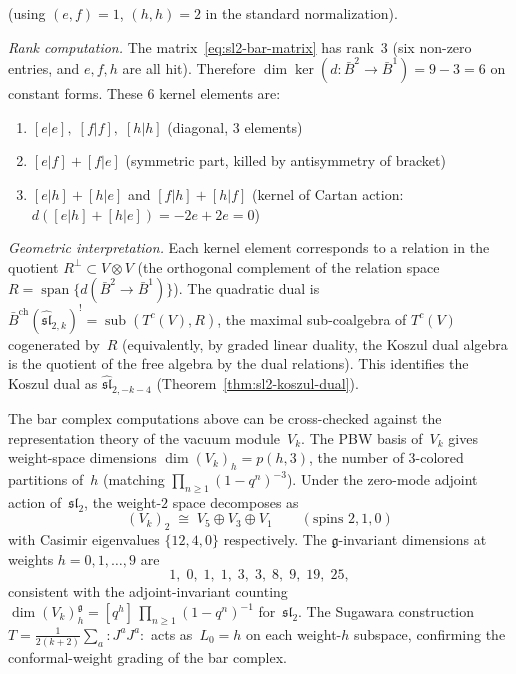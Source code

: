 \begin{computation}
(using $(e,f) = 1$, $(h,h) = 2$ in the standard normalization).

\emph{Rank computation.}
The matrix~\eqref{eq:sl2-bar-matrix} has rank~$3$
(six non-zero entries, and $e, f, h$ are all hit).
Therefore $\dim \ker(d\colon \bar{B}^2 \to \bar{B}^1) = 9 - 3 = 6$
on constant forms.  These 6 kernel elements are:
\begin{enumerate}
\item $[e|e],\; [f|f],\; [h|h]$ (diagonal, $3$ elements)
\item $[e|f] + [f|e]$ (symmetric part, killed by antisymmetry of bracket)
\item $[e|h] + [h|e]$ and $[f|h] + [h|f]$
  (kernel of Cartan action: $d([e|h] + [h|e]) = -2e + 2e = 0$)
\end{enumerate}

\emph{Geometric interpretation.}
Each kernel element corresponds to a relation in the quotient
$R^\perp \subset V \otimes V$ (the orthogonal complement of the
relation space $R = \operatorname{span}\{d(\bar{B}^2 \to \bar{B}^1)\}$).  The quadratic dual is
$\bar{B}^{\mathrm{ch}}(\widehat{\mathfrak{sl}}_{2,k})^!
= \operatorname{sub}(T^c(V), R)$, the maximal sub-coalgebra of $T^c(V)$ cogenerated by~$R$ (equivalently, by graded linear duality, the Koszul dual algebra is the quotient of the free algebra by the dual relations). This identifies the Koszul dual as
$\widehat{\mathfrak{sl}}_{2,-k-4}$
(Theorem~\ref{thm:sl2-koszul-dual}).
\end{computation}

\begin{remark}\label{rem:sl2-vacuum-module-verification}
The bar complex computations above can be cross-checked against
the representation theory of the vacuum module~$V_k$.
The PBW basis of~$V_k$ gives weight-space dimensions
$\dim(V_k)_h = p(h,3)$, the number of $3$-colored partitions of~$h$
(matching $\prod_{n \ge 1}(1-q^n)^{-3}$).
Under the zero-mode adjoint action of~$\mathfrak{sl}_2$,
the weight-$2$ space decomposes as
\begin{equation}\label{eq:sl2-weight2-decomp}
(V_k)_2 \;\cong\; V_5 \oplus V_3 \oplus V_1
\qquad (\text{spins } 2, 1, 0)
\end{equation}
with Casimir eigenvalues $\{12, 4, 0\}$ respectively.
The $\mathfrak{g}$-invariant dimensions at weights $h = 0, 1,
\ldots, 9$ are
\[
1,\; 0,\; 1,\; 1,\; 3,\; 3,\; 8,\; 9,\; 19,\; 25,
\]
consistent with the adjoint-invariant counting
$\dim (V_k)_h^{\mathfrak{g}} = [q^h]\,\prod_{n \ge 1}
(1-q^n)^{-1}$ for~$\mathfrak{sl}_2$.
The Sugawara construction
$T = \frac{1}{2(k+2)}\sum_a {:}J^a J^a{:}$
acts as~$L_0 = h$ on each weight-$h$ subspace, confirming the
conformal-weight grading of the bar complex.
\end{remark}

